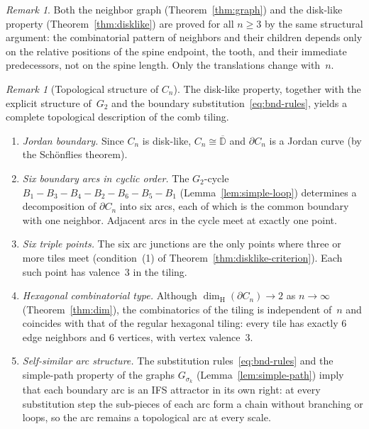 \documentclass{amsart}
\theoremstyle{definition}
\theoremstyle{remark}
\newtheorem{remark}[theorem]{Remark}
\newcommand{\dH}{\dim_{\mathrm{H}}}
\begin{document}
\begin{remark}
Both the neighbor graph (Theorem~\ref{thm:graph}) and the disk-like
property (Theorem~\ref{thm:disklike}) are proved for all $n \ge 3$ by
the same structural argument: the combinatorial pattern of neighbors
and their children depends only on the relative positions of the
spine endpoint, the tooth, and their immediate predecessors,
not on the spine length.  Only the translations change with~$n$.
\end{remark}

\begin{remark}[Topological structure of $C_n$]
\label{rem:topology}
The disk-like property, together with the explicit structure of~$G_2$
and the boundary substitution~\eqref{eq:bnd-rules}, yields a
complete topological description of the comb tiling.

\begin{enumerate}
\item \emph{Jordan boundary.}
Since $C_n$ is disk-like, $C_n \cong \overline{\mathbb{D}}$ and
$\partial C_n$ is a Jordan curve (by the Sch\"onflies theorem).

\item \emph{Six boundary arcs in cyclic order.}
The $G_2$-cycle
$B_1 \!-\! B_3 \!-\! B_4 \!-\! B_2 \!-\! B_6 \!-\! B_5 \!-\! B_1$
(Lemma~\ref{lem:simple-loop}) determines a decomposition of
$\partial C_n$ into six arcs, each of which is the common boundary
with one neighbor.  Adjacent arcs in the cycle meet at exactly one
point.

\item \emph{Six triple points.}
The six arc junctions are the only points where three or more tiles
meet (condition~(1) of Theorem~\ref{thm:disklike-criterion}).
Each such point has valence~$3$ in the tiling.

\item \emph{Hexagonal combinatorial type.}
Although $\dH(\partial C_n) \to 2$ as $n \to \infty$
(Theorem~\ref{thm:dim}), the combinatorics of the tiling is
independent of~$n$ and coincides with that of the regular hexagonal
tiling: every tile has exactly $6$ edge neighbors and $6$ vertices,
with vertex valence~$3$.

\item \emph{Self-similar arc structure.}
The substitution rules~\eqref{eq:bnd-rules} and the simple-path
property of the graphs $G_{\sigma_k}$
(Lemma~\ref{lem:simple-path}) imply that each boundary arc is an
IFS attractor in its own right: at every substitution step the
sub-pieces of each arc form a chain without branching or loops,
so the arc remains a topological arc at every scale.
\end{enumerate}
\end{remark}
\end{document}
